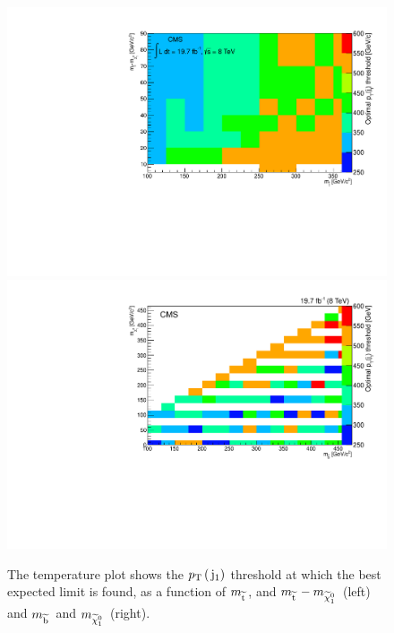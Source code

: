 \begin{figure}[!Hhtb]
  \begin{center}
  \includegraphics[scale=0.39]{Figures/sus13009/limits/optimalLimits.pdf}
  \includegraphics[scale=0.39]{Figures/sus13009/sbottomlimits/optimal_jet1pT.pdf}
  \caption{The temperature plot shows the $p_{\text{T}}\,(\,\mathrm{j}_1)$ threshold at which the best expected limit is found, as a function of $m_{\widetilde{{\rm t}}\,}$, and $m_{\widetilde{{\rm t}}\,} - m_{\widetilde{\chi}^{0}_{1}\,}$ (left) and $m_{\widetilde{{\rm b}}\,}$ and $m_{\widetilde{\chi}^{0}_{1}\,}$ (right).}
  \label{fig:optimalJ1}
  \end{center}
\end{figure}



